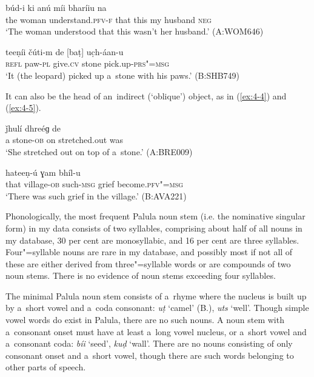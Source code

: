\begin{exe}
\ex
\label{ex:4-2}
\gll [se kúṛi] búd-i ki anú míi bharíiu na \\
	the woman understand.\textsc{pfv-f} that this my husband \textsc{neg} \\
\glt `The woman understood that this wasn't her husband.' (A:WOM646)
\end{exe}

\begin{exe}
\ex
\label{ex:4-3}
\gll teeṇíi čúti-m de [baṭ] uc̣h-áan-u \\
	\textsc{refl} paw-\textsc{pl} give.\textsc{cv} stone pick.up-\textsc{prs"=msg} \\
\glt `It (the leopard) picked up a~stone with his paws.' (B:SHB749)
\end{exe}

It can also be the head of an~indirect (`oblique') object, as in (\ref{ex:4-4}) and (\ref{ex:4-5}).

\begin{exe}
\ex
\label{ex:4-4}
\gll [áa baṭ-á] ǰhulí dhreéɡ de \\ a stone-\textsc{ob} on stretched.out was \\
\glt `She stretched out on top of a~stone.' (A:BRE009)
\end{exe}

\begin{exe}
\ex
\label{ex:4-5}
 hateeṇ-ú ɣam bhíl-u \\
	that village-\textsc{ob} such-\textsc{msg} grief become.\textsc{pfv"=msg} \\
\glt `There was such grief in the village.' (B:AVA221)
\end{exe}


Phonologically, the most frequent Palula noun stem (i.e. the nominative singular form) in my data consists of two syllables, comprising about half of all nouns in my database, 30 per cent are monosyllabic, and 16 per cent are three syllables. Four"=syllable nouns are rare in my database, and possibly most if not all of these are either derived from three"=syllable words or are compounds of two noun stems. There is no evidence of noun stems exceeding four syllables. 


The minimal Palula noun stem consists of a~rhyme where the nucleus is built up by a~short vowel and a~coda consonant: \textit{uṭ} `camel' (B.), \textit{uts} `well'. Though simple vowel words do exist in Palula, there are no such nouns. A noun stem with a~consonant onset must have at least a~long vowel nucleus, or a~short vowel and a~consonant coda: \textit{bíi} `seed', \textit{kuḍ} `wall'. There are no nouns consisting of only consonant onset and a~short vowel, though there are such words belonging to other parts of speech.


